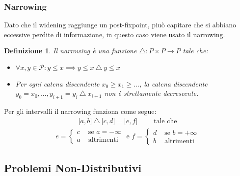\documentclass{article}
\newtheorem{definit}{Definizione}[subsection]
\begin{document}
            \subsubsection{Narrowing}
                Dato che il widening raggiunge un post-fixpoint, piuò capitare che si abbiano eccessive perdite di informazione, in questo caso viene usato il narrowing.
                
                \begin{definit}
                    Il narrowing è una funzione $ \triangle : P \times P \to P$ tale che:
                    \begin{itemize}
                        \item $\forall x, y \in \mathcal{P}: y \leq x \implies y \leq x\ \triangle\ y \leq x$
                        \item Per ogni catena discendente $x_0 \geq x_1 \geq ...$, la catena discendente $y_0=x_0, ..., y_{i+1} = y_i\ \triangle\ x_{i+1}$ non è strettamente decrescente.
                    \end{itemize}
                \end{definit}

                Per gli intervalli il narrowing funziona come segue:
                \begin{align*}
                \lbrack a, b \rbrack\ \triangle\ \lbrack c, d \rbrack = \lbrack e, f \rbrack \qquad \text{ tale che}
                \end{align*}
                \begin{align*}
                e = 
                \begin{cases}
                c &\text{ se } a = -\infty \\
                a &\text{ altrimenti}
                \end{cases}
                \text{ e } f = 
                \begin{cases}
                d &\text{ se } b = +\infty\\
                b &\text{ altrimenti }
                \end{cases}
                \end{align*}

        \newpage
        \subsection{Problemi Non-Distributivi}
\end{document}
